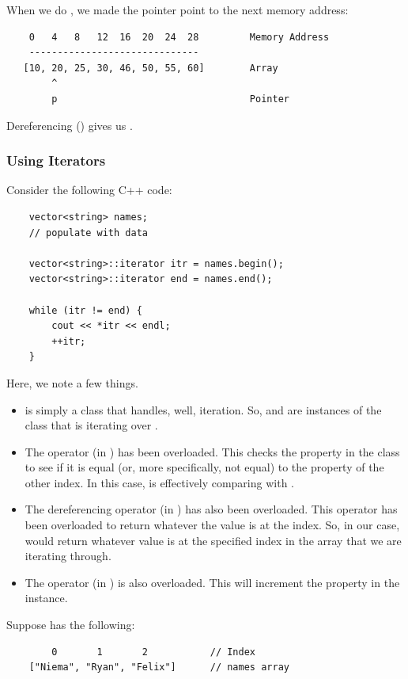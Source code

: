 \documentclass[letterpaper]{article}
\begin{document}
\bigskip 

When we do , we made the pointer point to the next memory address: 
\begin{verbatim}
    0   4   8   12  16  20  24  28         Memory Address 
    ------------------------------
   [10, 20, 25, 30, 46, 50, 55, 60]        Array 
        ^
        p                                  Pointer 
\end{verbatim}
Dereferencing  () gives us . 


\subsubsection{Using Iterators}
Consider the following C++ code: 
\begin{verbatim}
    vector<string> names; 
    // populate with data 

    vector<string>::iterator itr = names.begin(); 
    vector<string>::iterator end = names.end(); 
    
    while (itr != end) {
        cout << *itr << endl; 
        ++itr; 
    }
\end{verbatim}
Here, we note a few things. 
\begin{itemize}
    \item {} is simply a class that handles, well, iteration. So,  and  are instances of the  class that is iterating over . 
    \item The \code{!=} operator (in ) has been overloaded. This checks the  property in the  class to see if it is equal (or, more specifically, not equal) to the  property of the other index. In this case,  is effectively comparing  with . 
    \item The \code{*} dereferencing operator (in ) has also been overloaded. This operator has been overloaded to return whatever the value is at the  index. So, in our case, would return whatever value is at the specified  index in the array that we are iterating through. 
    \item The \code{++} operator (in ) is also overloaded. This will increment the  property in the  instance. 
\end{itemize}

Suppose  has the following: 
\begin{verbatim}
        0       1       2           // Index 
    ["Niema", "Ryan", "Felix"]      // names array 
\end{verbatim}
\end{document}
